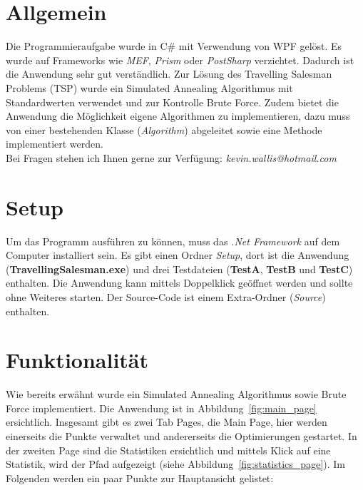 \documentclass[a4paper, 12pt]{article}
\begin{document}
\section*{Allgemein}
Die Programmieraufgabe wurde in C\# mit Verwendung von WPF gelöst. Es wurde auf Frameworks wie \textit{MEF}, \textit{Prism} oder \textit{PostSharp} verzichtet. Dadurch ist die Anwendung sehr gut verst\"andlich. Zur L\"osung des Travelling Salesman Problems (TSP) wurde ein Simulated Annealing Algorithmus mit Standardwerten verwendet und zur Kontrolle Brute Force. Zudem bietet die Anwendung die M\"oglichkeit eigene Algorithmen zu implementieren, dazu muss von einer bestehenden Klasse (\textit{Algorithm}) abgeleitet sowie eine Methode implementiert werden.\\
Bei Fragen stehen ich Ihnen gerne zur Verfügung: \textit{kevin.wallis@hotmail.com}

\section*{Setup}
Um das Programm ausf\"uhren zu k\"onnen, muss das \textit{.Net Framework} auf dem Computer installiert sein. Es gibt einen Ordner \textit{Setup}, dort ist die Anwendung (\textbf{TravellingSalesman.exe}) und drei Testdateien (\textbf{TestA}, \textbf{TestB} und \textbf{TestC}) enthalten. Die Anwendung kann mittels Doppelklick ge\"offnet werden und sollte ohne Weiteres starten. Der Source-Code ist einem Extra-Ordner (\textit{Source}) enthalten.

\section*{Funktionalit\"at}
Wie bereits erw\"ahnt wurde ein Simulated Annealing Algorithmus sowie Brute Force implementiert. Die Anwendung ist in Abbildung~\ref{fig:main_page} ersichtlich. Insgesamt gibt es zwei Tab Pages, die Main Page, hier werden einerseits die Punkte verwaltet und andererseits die Optimierungen gestartet. In der zweiten Page sind die Statistiken ersichtlich und mittels Klick auf eine Statistik, wird der Pfad aufgezeigt (siehe Abbildung~\ref{fig:statistics_page}). Im Folgenden werden ein paar Punkte zur Hauptansicht gelistet: 
\end{document}

